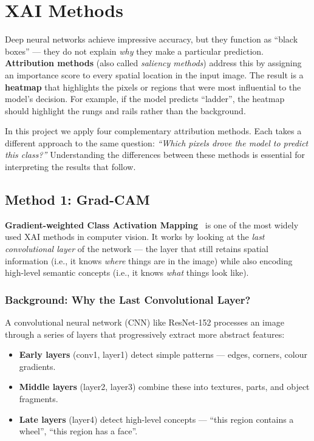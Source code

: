 \documentclass[12pt, a4paper]{article}
\begin{document}
\section{XAI Methods}
\label{sec:xai_methods}

Deep neural networks achieve impressive accuracy, but they function as
``black boxes'' --- they do not explain \emph{why} they make a particular
prediction.  \textbf{Attribution methods} (also called \emph{saliency methods})
address this by assigning an importance score to every spatial location in the
input image.  The result is a \textbf{heatmap} that highlights the pixels or
regions that were most influential to the model's decision.  For example, if
the model predicts ``ladder'', the heatmap should highlight the rungs and
rails rather than the background.

In this project we apply four complementary attribution methods.  Each takes a
different approach to the same question:
\textit{``Which pixels drove the model to predict this class?''}
Understanding the differences between these methods is essential for
interpreting the results that follow.


\subsection{Method 1: Grad-CAM}

\textbf{Gradient-weighted Class Activation Mapping}~\cite{selvaraju2017gradcam}
is one of the most widely used XAI methods in computer vision.  It works by
looking at the \emph{last convolutional layer} of the network --- the layer
that still retains spatial information (i.e., it knows \emph{where} things are
in the image) while also encoding high-level semantic concepts (i.e., it knows
\emph{what} things look like).

\subsubsection{Background: Why the Last Convolutional Layer?}

A convolutional neural network (CNN) like ResNet-152 processes an image through
a series of layers that progressively extract more abstract features:
\begin{itemize}[leftmargin=*]
    \item \textbf{Early layers} (conv1, layer1) detect simple patterns ---
          edges, corners, colour gradients.
    \item \textbf{Middle layers} (layer2, layer3) combine these into textures,
          parts, and object fragments.
    \item \textbf{Late layers} (layer4) detect high-level concepts --- ``this
          region contains a wheel'', ``this region has a face''.
\end{itemize}
\end{document}

